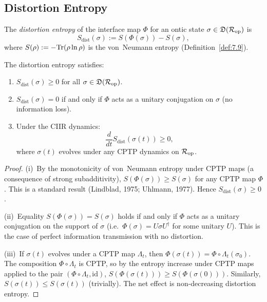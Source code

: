 \subsection{Distortion Entropy}
\label{sec:ch8:distortion-entropy}

\begin{definition}
\label{def:8.22}
The \emph{distortion entropy} of the interface map $\Phi$ for an
ontic state $\sigma \in \mathfrak{D}(\mathcal{R}_{\mathrm{op}})$ is
\[
  S_{\mathrm{dist}}(\sigma)
  := S(\Phi(\sigma)) - S(\sigma),
\]
where $S(\rho) := -\mathrm{Tr}(\rho \ln \rho)$ is the von~Neumann entropy
\textup{(}Definition~\textup{\ref{def:7.9})}.
\end{definition}

\begin{proposition}
\label{prop:8.5}
The distortion entropy satisfies:
\begin{enumerate}
  \item[\textup{(i)}] $S_{\mathrm{dist}}(\sigma) \geq 0$ for all
    $\sigma \in \mathfrak{D}(\mathcal{R}_{\mathrm{op}})$.
  \item[\textup{(ii)}] $S_{\mathrm{dist}}(\sigma) = 0$ if and only if
    $\Phi$ acts as a unitary conjugation on $\sigma$
    \textup{(}no information loss\textup{)}.
  \item[\textup{(iii)}] Under the CIIR dynamics:
    \[
      \frac{d}{dt}S_{\mathrm{dist}}(\sigma(t))
      \geq 0,
    \]
    where $\sigma(t)$ evolves under any CPTP dynamics on
    $\mathcal{R}_{\mathrm{op}}$.
\end{enumerate}
\end{proposition}

\begin{proof}
(i)~By the monotonicity of von~Neumann entropy under CPTP maps
(a consequence of strong subadditivity), $S(\Phi(\sigma)) \geq
S(\sigma)$ for any CPTP map $\Phi$.  This is a standard result
(Lindblad, 1975; Uhlmann, 1977).  Hence
$S_{\mathrm{dist}}(\sigma) \geq 0$.

(ii)~Equality $S(\Phi(\sigma)) = S(\sigma)$ holds if and only if
$\Phi$ acts as a unitary conjugation on the support of $\sigma$
(i.e.\ $\Phi(\sigma) = U\sigma U^\dagger$ for some unitary $U$).
This is the case of perfect information transmission with no distortion.

(iii)~If $\sigma(t)$ evolves under a CPTP map $\Lambda_t$, then
$\Phi(\sigma(t)) = \Phi \circ \Lambda_t(\sigma_0)$.  The composition
$\Phi \circ \Lambda_t$ is CPTP, so by the entropy increase under CPTP
maps applied to the pair $(\Phi \circ \Lambda_t, \mathrm{id})$,
$S(\Phi(\sigma(t))) \geq S(\Phi(\sigma(0)))$.  Similarly,
$S(\sigma(t)) \leq S(\sigma(t))$ (trivially).  The net effect is
non-decreasing distortion entropy.
\end{proof}

